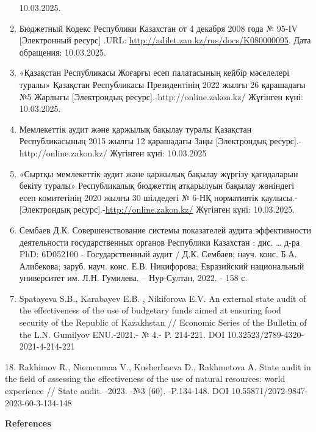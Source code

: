 \begin{enumerate}
  10.03.2025.
\item
  Бюджетный Кодекс Республики Казахстан от 4 декабря 2008 года № 95-IV
  {[}Электронный ресурс{]} .URL:
  \url{http://adilet.zan.kz/rus/docs/K080000095}. Дата обращения:
  10.03.2025.
\item
  «Қазақстан Республикасы Жоғарғы есеп палатасының кейбір мәселелері
  туралы» Қазақстан Республикасы Президентінің 2022 жылғы 26 қарашадағы
  №5 Жарлығы {[}Электрондық ресурс{]}.-http://online.zakon.kz/ Жүгінген
  күні: 10.03.2025.
\item
  Мемлекеттік аудит және қаржылық бақылау туралы Қазақстан
  Республикасының 2015 жылғы 12 қарашадағы Заңы {[}Электрондық
  ресурс{]}.-http://online.zakon.kz/ Жүгінген күні: 10.03.2025
\item
  «Сыртқы мемлекеттік аудит және қаржылық бақылау жүргізу қағидаларын
  бекіту туралы» Республикалық бюджеттің атқарылуын бақылау жөніндегі
  есеп комитетінің 2020 жылғы 30 шілдедегі № 6-НҚ нормативтік
  қаулысы.-{[}Электрондық ресурс{]}.-\url{http://online.zakon.kz/}
  Жүгінген күні: 10.03.2025.
\item
  Сембаев Д.К. Совершенствование системы показателей аудита
  эффективности деятельности государственных органов Республики
  Казахстан : дис. \ldots{} д-ра PhD: 6D052100 - Государственный аудит /
  Д.К. Сембаев; науч. конс. Б.А. Алибекова; заруб. науч. конс. Е.В.
  Никифорова; Евразийский национальный университет им. Л.Н. Гумилева. --
  Нур-Султан, 2022. - 158 с.
\item
  Spatayeva S.B., Karabayev E.B. , Nikiforova E.V. An external state
  audit of the effectiveness of the use of budgetary funds aimed at
  ensuring food security of the Republic of Kazakhstan // Economic
  Series of the Bulletin of the L.N. Gumilyov ENU.-2021.- № 4.- P.
  214-221. DOI 10.32523/2789-4320-2021-4-214-221
\end{enumerate}

18. Rakhimov R., Niemenmaa V., Kusherbaeva D., Rakhmetova А. State audit
in the field of assessing the effectiveness of the use of natural
resources: world experience // State audit. -2023. -№3 (60). -P.134-148.
DOI 10.55871/2072-9847-2023-60-3-134-148

{\bfseries References}

